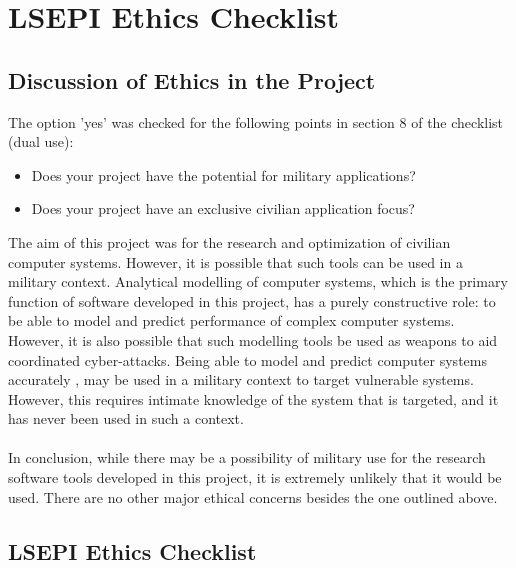 \newpage

\chapter{LSEPI Ethics Checklist}
\section{Discussion of Ethics in the Project}

The option 'yes' was checked for the following points in section 8 of the checklist (dual use):
\begin{itemize}
    \item Does your project have the potential for military applications?
    \item Does your project have an exclusive civilian application focus?
\end{itemize}

The aim of this project was for the research and optimization of civilian computer systems. However, it is possible that such tools can be used in a military context. Analytical modelling of computer systems, which is the primary function of software developed in this project, has a purely constructive role: to be able to model and predict performance of complex computer systems. However, it is also possible that such modelling tools be used as weapons to aid coordinated cyber-attacks. Being able to model and predict computer systems accurately , may be used in a military context to target vulnerable systems. However, this requires intimate knowledge of the system that is targeted, and it has never been used in such a context.
\\\\
In conclusion, while there may be a possibility of military use for the research software tools developed in this project, it is extremely unlikely that it would be used. There are no other major ethical concerns besides the one outlined above.

\newpage

\section{LSEPI Ethics Checklist}

